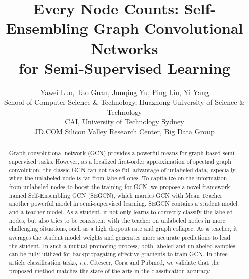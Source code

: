 \documentclass[letterpaper]{article} \usepackage{aaai19}  \usepackage{times}  \usepackage{helvet}  \usepackage{courier}  \usepackage{url}  \usepackage{graphicx}  \usepackage{algorithm}
\begin{document}
\title{Every Node Counts: Self-Ensembling Graph Convolutional Networks \\ for Semi-Supervised Learning}

\author{Yawei Luo,\hspace{2mm} Tao Guan,\hspace{2mm} Junqing Yu,\hspace{2mm} Ping Liu,\hspace{2mm} Yi Yang \vspace{0.5cm} \\
School of Computer Science \& Technology, Huazhong University of Science \& Technology\\
CAI, University of Technology Sydney\\
JD.COM Silicon Valley Research Center, Big Data Group
}

\maketitle
\begin{abstract}
Graph convolutional network (GCN) provides a powerful means for graph-based semi-supervised tasks. However, as a localized first-order approximation of spectral graph convolution, the classic GCN can not take full advantage of unlabeled data, especially when the unlabeled node is far from labeled ones. To capitalize on the information from unlabeled nodes to boost the training for GCN, we propose a novel framework named Self-Ensembling GCN (SEGCN), which marries GCN with Mean Teacher -- another powerful model in semi-supervised learning. SEGCN contains a student model and a teacher model. As a student, it not only learns to correctly classify the labeled nodes, but also tries to be consistent with the teacher on unlabeled nodes in more challenging situations, such as a high dropout rate and graph collapse. As a teacher, it averages the student model weights and generates more accurate predictions to lead the student. In such a mutual-promoting process, both labeled and unlabeled samples can be fully utilized for backpropagating effective gradients to train GCN. In three article classification tasks, \emph{i.e.} Citeseer, Cora and Pubmed, we validate that the proposed method matches the state of the arts in the classification accuracy.
\end{abstract}
\end{document}
